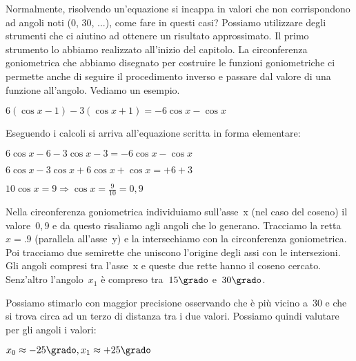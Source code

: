  Normalmente, risolvendo un'equazione si incappa in valori che non 
 corrispondono ad angoli noti (0\grado, 30\grado, ...), come fare in questi 
 casi? Possiamo utilizzare degli strumenti che ci aiutino ad ottenere un 
 risultato approssimato. Il primo strumento lo abbiamo realizzato all'inizio 
 del capitolo. La circonferenza goniometrica che abbiamo disegnato per 
 costruire le funzioni goniometriche ci permette anche di seguire il 
 procedimento inverso e passare dal valore di una funzione all'angolo. 
 Vediamo un esempio.
 
 \begin{esempio}
  \(6 ( \cos x -1) -3 ( \cos x +1) = -6 \cos x - \cos x\)
  
  Eseguendo i calcoli si arriva all'equazione scritta in forma elementare:
  
  \(6 \cos x -6 -3 \cos x -3 = -6 \cos x - \cos x\)
  
  \(6 \cos x -3 \cos x +6 \cos x + \cos x = +6 +3\)
  
  \(10 \cos x= 9 \Rightarrow \cos x = \frac{9}{10} = 0,9\)


 \vspace{-6pt}
 \begin{minipage}{.50\textwidth}
Nella circonferenza goniometrica individuiamo sull'asse~x (nel caso del 
coseno) il valore~\(0,9\) e da questo risaliamo agli angoli che lo generano.
Tracciamo la retta~\(x=.9\) (parallela all'asse~y) e la intersechiamo con
la circonferenza goniometrica. Poi tracciamo due semirette che uniscono 
l'origine degli assi con le intersezioni. Gli angoli compresi tra l'asse~x 
e queste due rette hanno il coseno cercato. Senz'altro l'angolo~\(x_1\) è 
compreso tra~\(15\grado\) e~\(30\grado\).

Possiamo stimarlo con maggior precisione osservando che è più vicino a~\(30\) 
e che si trova circa ad un terzo di distanza tra i due valori. 
Possiamo quindi valutare per gli angoli i valori:

\(x_0 \approx -25\grado, x_1 \approx +25\grado\)
 \end{minipage}
 \begin{minipage}{.45\textwidth}
  \begin{center}
\begin{inaccessibleblock}[Soluzione grafica approssimata dell'equazione: 
    \(\cos x = 0,8\).]
    
\end{inaccessibleblock}
  \end{center}
 \end{minipage}
 
 \end{esempio}

